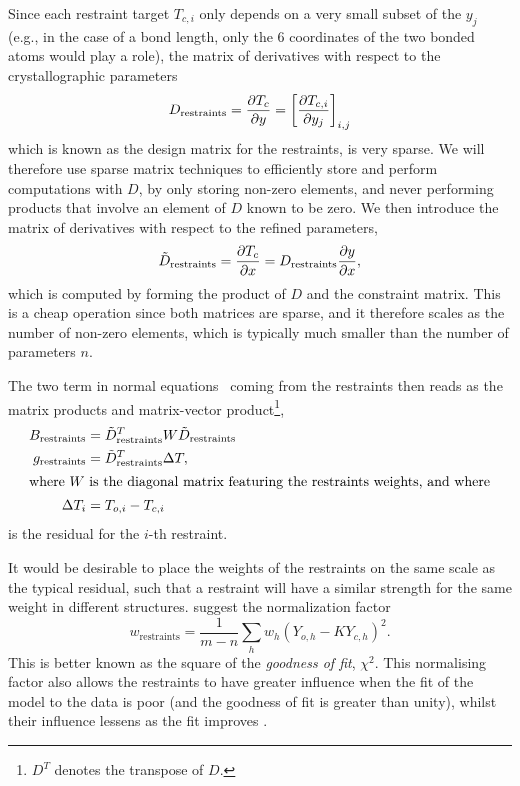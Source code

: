 \documentclass[pdf]{iucr}
\begin{document}
Since each restraint target $T_{c,i}$ only depends on a very small subset of the $y_j$ (e.g., in the case of a bond length, only the 6 coordinates of the two bonded atoms would play a role), the matrix of derivatives with respect to the crystallographic parameters
\begin{equation}
D_\text{restraints} = \frac{\partial T_c}{\partial y} = \left[\frac{\partial T_{c,i}}{\partial y_j}\right]_{i,j}
\end{equation}
which is known as the design matrix for the restraints, is very sparse. We will therefore use sparse matrix techniques to efficiently store and perform computations with $D$, by only storing non-zero elements, and never performing products that involve an element of $D$ known to be zero. We then introduce the matrix of derivatives with respect to the refined parameters,
\begin{equation}
\tilde{D}_\text{restraints} = \frac{\partial T_c}{\partial x} = D_\text{restraints} \frac{\partial y}{\partial x},
\end{equation}
which is computed by forming the product of $D$ and the constraint matrix. This is a cheap operation since both matrices are sparse, and it therefore scales as the number of non-zero elements, which is typically much smaller than the number of parameters $n$. 

The two term in normal equations~ coming from the restraints then reads as the matrix products and matrix-vector product\footnote{$D^T$ denotes the transpose of $D$.},
\begin{align}
B_\text{restraints} &= \tilde{D}_\text{restraints}^T W \tilde{D}_\text{restraints}\\
g_\text{restraints} &= \tilde{D}_\text{restraints}^T \Delta T,\\
\intertext{where $W$ is the diagonal matrix featuring the restraints weights, and where}
\Delta T_i &= T_{o,i} - T_{c,i}
\end{align}
is the residual for the $i$-th restraint.

It would be desirable to place the weights of the restraints on the same scale as the typical residual, such that a restraint will have a similar strength for the same weight in different structures. \cite{Giacovazzo:2002} suggest the normalization factor
\begin{equation}
w_\text{restraints} = \frac{1}{m-n} \sum_{h}{ w_h (Y_{o,h} - K Y_{c,h})^2}.
\label{eqn:giacovazzo_normalisation}
\end{equation}
This is better known as the square of the \emph{goodness of fit}, $\chi^2$. This normalising factor also allows the restraints to have greater influence when the fit of the model to the data is poor (and the goodness of fit is greater than unity), whilst their influence lessens as the fit improves \cite{SHELX:man97}.
\end{document}
